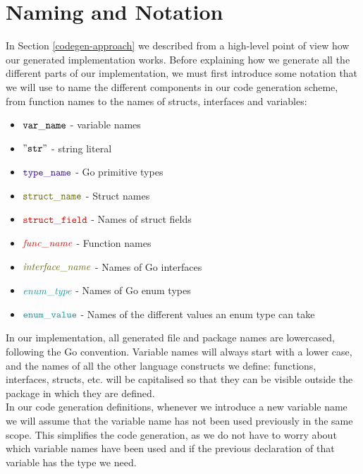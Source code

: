 \documentclass[12pt,twoside]{report}
\begin{document}
\section{Naming and Notation}\label{naming-and-notation}
In Section \ref{codegen-approach} we described from a high-level point of view how our generated implementation works. Before  explaining how we generate all the different parts of our implementation, we must first introduce some notation that we will use to name the different components in our code generation scheme, from function names to the names of structs, interfaces and variables:

\begin{itemize}
    \item ${\mathtt{var\_name}}$ - variable names
    \item $\mathtt{"str"}$ - string literal
    \item $\typename{type\_name}$ - Go primitive types
    \item $\structname{struct\_name}$ - Struct names
    \item $\structfield{struct\_field}$ - Names of struct fields
    \item $\functionname{func\_name}$ - Function names
    \item $\interfacename{interface\_name}$ - Names of Go interfaces
    \item $\enumtype{enum\_type}$ - Names of Go enum types
    \item $\enumvalue{enum\_value}$ - Names of the different values an enum type can take
\end{itemize}

In our implementation, all generated file and package names are lowercased, following the Go convention. Variable names will always start with a lower case, and the names of all the other language constructs we define: functions, interfaces, structs, etc. will be capitalised so that they can be visible outside the package in which they are defined.\\

In our code generation definitions, whenever we introduce a new variable name we will assume that the variable name has not been used previously in the same scope. This simplifies the code generation, as we do not have to worry about which variable names have been used and if the previous declaration of that variable has the type we need.\\
\end{document}
